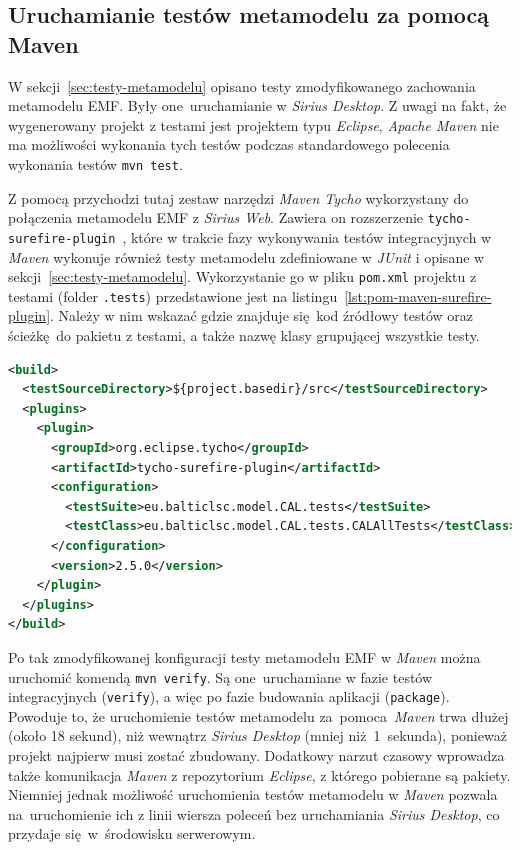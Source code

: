 \subsection{Uruchamianie testów metamodelu za pomocą Maven}

W sekcji~\ref{sec:testy-metamodelu} opisano testy zmodyfikowanego zachowania
metamodelu EMF\@. Były one~uruchamianie w \emph{Sirius Desktop}. Z uwagi na
fakt, że
wygenerowany projekt z testami jest projektem typu \emph{Eclipse}, \emph{Apache
	Maven} nie ma możliwości wykonania tych testów podczas standardowego
polecenia
wykonania testów \lstinline{mvn test}.

Z pomocą przychodzi tutaj zestaw narzędzi \emph{Maven Tycho} wykorzystany do
połączenia metamodelu \gls{EMF} z \emph{Sirius Web}. Zawiera on rozszerzenie
\texttt{tycho-surefire-plugin}~\cite{maven-surefire-plugin-homepage}, które w
trakcie fazy wykonywania testów
integracyjnych w \emph{Maven} wykonuje również testy metamodelu zdefiniowane w
\emph{JUnit} i opisane w sekcji~\ref{sec:testy-metamodelu}.
Wykorzystanie go w pliku \texttt{pom.xml} projektu z testami (folder
\texttt{.tests}) przedstawione jest na
listingu~\ref{lst:pom-maven-surefire-plugin}. Należy w nim wskazać gdzie
znajduje się kod źródłowy testów oraz ścieżkę do pakietu z testami, a także
nazwę klasy grupującej wszystkie testy.

\begin{lstlisting}[float,
    floatplacement=!hb,
    language=XML,
    caption={Wykorzystanie rozszerzenia \emph{Maven Surefire} w
    \texttt{pom.xml} projektu z testami metamodelu.},
    label={lst:pom-maven-surefire-plugin}]
<build>
  <testSourceDirectory>${project.basedir}/src</testSourceDirectory>
  <plugins>
    <plugin>
      <groupId>org.eclipse.tycho</groupId>
      <artifactId>tycho-surefire-plugin</artifactId>
      <configuration>
        <testSuite>eu.balticlsc.model.CAL.tests</testSuite>
        <testClass>eu.balticlsc.model.CAL.tests.CALAllTests</testClass>
      </configuration>
      <version>2.5.0</version>
    </plugin>
  </plugins>
</build>
\end{lstlisting}

Po tak zmodyfikowanej konfiguracji
testy metamodelu \gls{EMF} w \emph{Maven} można uruchomić komendą
\lstinline{mvn verify}. Są one uruchamiane w fazie testów integracyjnych
(\texttt{verify}), a
więc po fazie budowania aplikacji (\texttt{package}). Powoduje to, że
uruchomienie testów metamodelu za~pomoca \emph{Maven} trwa dłużej (około
18 sekund), niż
wewnątrz \emph{Sirius Desktop} (mniej niż~1~sekunda), ponieważ projekt
najpierw musi zostać zbudowany. Dodatkowy narzut czasowy wprowadza także
komunikacja
\emph{Maven} z repozytorium \emph{Eclipse}, z którego pobierane są pakiety.
Niemniej jednak możliwość uruchomienia testów metamodelu w \emph{Maven} pozwala
na~uruchomienie ich z linii wiersza poleceń bez uruchamiania \emph{Sirius
	Desktop}, co przydaje się~w~środowisku serwerowym.

